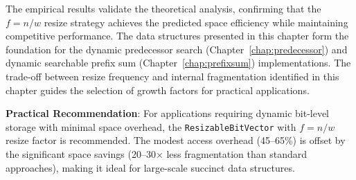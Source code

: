 The empirical results validate the theoretical analysis, confirming that the $f = n/w$ resize strategy achieves the predicted space efficiency while maintaining competitive performance. The data structures presented in this chapter form the foundation for the dynamic predecessor search (Chapter~\ref{chap:predecessor}) and dynamic searchable prefix sum (Chapter~\ref{chap:prefixsum}) implementations. The trade-off between resize frequency and internal fragmentation identified in this chapter guides the selection of growth factors for practical applications.

\textbf{Practical Recommendation}: For applications requiring dynamic bit-level storage with minimal space overhead, the \texttt{ResizableBitVector} with $f = n/w$ resize factor is recommended. The modest access overhead (45--65\%) is offset by the significant space savings (20--30$\times$ less fragmentation than standard approaches), making it ideal for large-scale succinct data structures.
